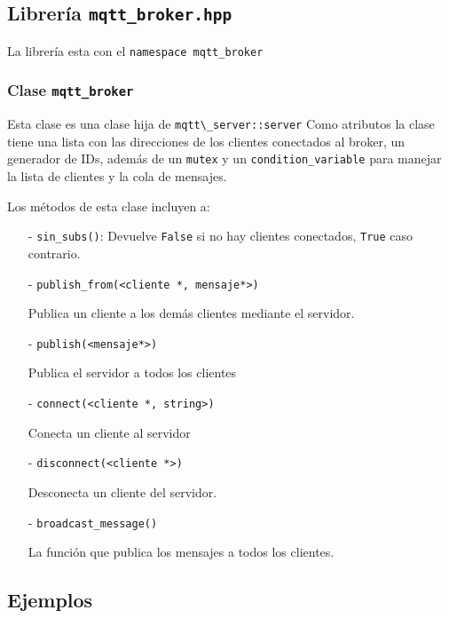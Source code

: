 \subsection{Librería \texttt{mqtt\_broker.hpp}}

La librería esta con el \texttt{namespace mqtt\_broker}
\subsubsection{Clase \texttt{mqtt\_broker}}
Esta clase es una clase hija de \verb|mqtt\_server::server|
Como atributos la clase tiene una lista con las direcciones de los clientes conectados al broker, un generador de IDs, además de un \verb|mutex| y un \verb|condition_variable| para manejar la lista de clientes y la cola de mensajes.

Los métodos de esta clase incluyen a:

\begin{itemize}
    \item[-] \verb|sin_subs()|:
    Devuelve \verb|False| si no hay clientes conectados, \verb|True| caso contrario.
    
    \item[-] \verb|publish_from(<cliente *, mensaje*>)| 
    
    Publica un cliente a los demás clientes mediante el servidor.
    
    \item[-] \verb|publish(<mensaje*>)|
    
    Publica el servidor a todos los clientes

    \item[-] \verb|connect(<cliente *, string>)| 
    
    Conecta un cliente al servidor
    
    \item[-] \verb|disconnect(<cliente *>)|  
    
    Desconecta un cliente del servidor.
    
    \item[-] \verb|broadcast_message()| 
    
    La función que publica los mensajes a todos los clientes.
\end{itemize}



\subsection{Ejemplos}


